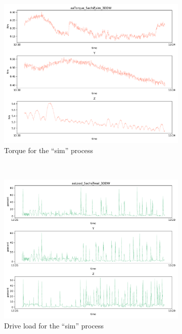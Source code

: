 \documentclass[english]{scrartcl}
\begin{document}
\begin{figure}
\begin{subfigure}[t]{0.5\textwidth}
        \includegraphics[width=\textwidth]{sim_torque.pdf}
        \caption{Torque for the ``sim'' process}
    \end{subfigure}%
    \\
    \begin{subfigure}[t]{0.5\textwidth}
        \includegraphics[width=\textwidth]{real_load.pdf}
        \caption{Drive load for the ``sim'' process}
    \end{subfigure}%
    ~
    \begin{subfigure}[t]{0.5\textwidth}

\end{subfigure}
\end{figure}
\end{document}

